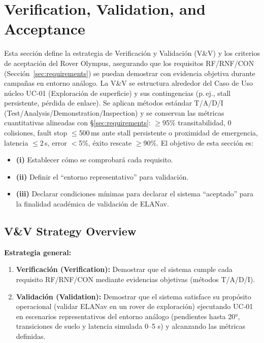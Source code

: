 
\section{Verification, Validation, and Acceptance}\label{sec:vv}

Esta sección define la estrategia de Verificación y Validación (V\&V) y los criterios de aceptación del Rover Olympus, asegurando que los requisitos RF/RNF/CON (Sección~\ref{sec:requirements}) se puedan demostrar con evidencia objetiva durante campañas en entorno análogo.  
La V\&V se estructura alrededor del Caso de Uso núcleo UC-01 (Exploración de superficie) y sus contingencias (p.\,ej., stall persistente, pérdida de enlace). Se aplican métodos estándar T/A/D/I (Test/Analysis/Demonstration/Inspection) y se conservan las métricas cuantitativas alineadas con \S\ref{sec:requirements}: $\ge$95\% transitabilidad, 0 colisiones, fault stop $\le$500\,ms ante stall persistente o proximidad de emergencia, latencia $\le$2\,s, error $<$5\%, éxito rescate $\ge$90\%.
El objetivo de esta sección es:
\begin{itemize}
    \item \textbf{(i)} Establecer cómo se comprobará cada requisito.
    \item \textbf{(ii)} Definir el ``entorno representativo'' para validación.
    \item \textbf{(iii)} Declarar condiciones mínimas para declarar el sistema ``aceptado'' para la finalidad académica de validación de ELANav.
\end{itemize}

\subsection{V\&V Strategy Overview}

\textbf{Estrategia general:}
\begin{enumerate}
    \item \textbf{Verificación (Verification):} Demostrar que el sistema cumple cada requisito RF/RNF/CON mediante evidencias objetivas (métodos T/A/D/I).  
    \item \textbf{Validación (Validation):} Demostrar que el sistema satisface su propósito operacional (validar ELANav en un rover de exploración) ejecutando UC‑01 en escenarios representativos del entorno análogo (pendientes hasta 20°, transiciones de suelo y latencia simulada 0–5 s) y alcanzando las métricas definidas.  
\end{enumerate}

